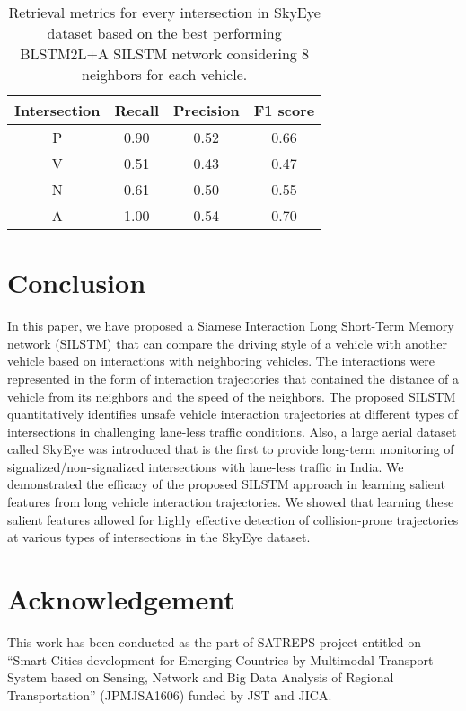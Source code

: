 \documentclass[final,journal]{IEEEtran}
\begin{document}
\begin{table}[htbp]
\centering
\caption{Retrieval metrics for every intersection in SkyEye dataset based on the best performing BLSTM2L+A SILSTM network considering 8 neighbors for each vehicle. }
\label{intersectionwise}
\begin{tabular}{|c|c|c|c|}
\hline
\textbf{Intersection} & \multicolumn{1}{l|}{\textbf{Recall}} & \multicolumn{1}{l|}{\textbf{Precision}} & \multicolumn{1}{l|}{\textbf{F1 score}} \\ \hline
P & 0.90 & 0.52 & 0.66 \\ \hline
V & 0.51 & 0.43 & 0.47 \\ \hline
N & 0.61 & 0.50 & 0.55 \\ \hline
A & 1.00 & 0.54 & 0.70 \\ \hline
\end{tabular}
\end{table}

\section{Conclusion} \label{conclusion}
In this paper, we have proposed a Siamese Interaction Long Short-Term Memory network (SILSTM) that can compare the driving style of a vehicle with another vehicle based on interactions with neighboring vehicles. The interactions were represented in the form of interaction trajectories that contained the distance of a vehicle from its neighbors and the speed of the neighbors. The proposed SILSTM quantitatively identifies unsafe vehicle interaction trajectories at different types of intersections in challenging lane-less traffic conditions. Also, a large aerial dataset called SkyEye was introduced that is the first to provide long-term monitoring of signalized/non-signalized intersections with lane-less traffic in India. We demonstrated the efficacy of the proposed SILSTM approach in learning salient features from long vehicle interaction trajectories. We showed that learning these salient  features allowed for highly effective detection of collision-prone trajectories at various types of intersections in the SkyEye dataset.

\section*{Acknowledgement}
This work has been conducted as the part of SATREPS project entitled on “Smart Cities development for Emerging Countries by Multimodal Transport System based on Sensing, Network and Big Data Analysis of Regional Transportation” (JPMJSA1606) funded by JST and JICA. 











\end{document}
